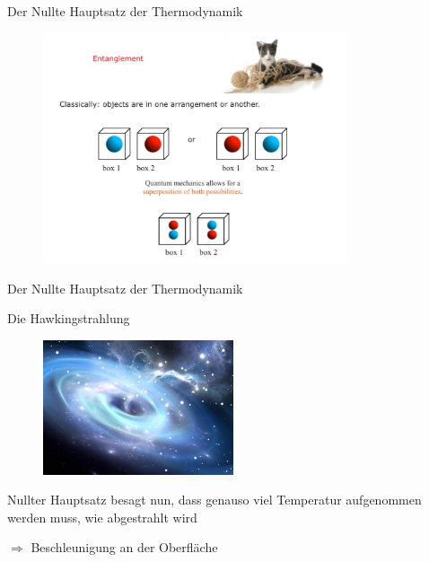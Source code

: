 \documentclass[ngerman,ph]{URbeamer}
\begin{document}
	\begin{frame}{Der Nullte Hauptsatz der Thermodynamik}	
		\begin{figure} [h] 
			\begin{center}
				\includegraphics[width=0.8\textwidth]{entanglement}
			\end{center}
		\end{figure} 	%
	\end{frame}
	\begin{frame}{Der Nullte Hauptsatz der Thermodynamik}
		\begin{center}
			\Large{Die Hawkingstrahlung} 
		\end{center}
		\begin{figure} [h] 
			\begin{center}
				\includegraphics[width=0.5\textwidth]{Hawkingstrahlung}
			\end{center}
		\end{figure} %
		Nullter Hauptsatz besagt nun, dass genauso viel Temperatur aufgenommen werden muss, wie abgestrahlt wird 
		
		$\Rightarrow$ Beschleunigung an der Oberfläche	
	\end{frame}
	
\end{document}
